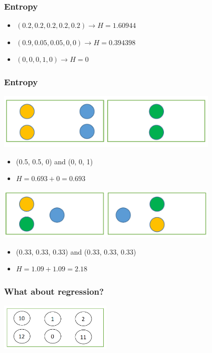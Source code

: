 \documentclass[default]{beamer}
\begin{document}
	\begin{frame}
		\frametitle{Entropy}
		\Large
		\begin{itemize}
			\item $(0.2, 0.2,0.2,0.2,0.2) \rightarrow H = 1.60944$
			\item $(0.9, 0.05,0.05,0, 0) \rightarrow H = 0.394398$
			\item $(0, 0,0, 1, 0) \rightarrow H = 0$
		\end{itemize}
		
	\end{frame}

	\begin{frame}
		\frametitle{Entropy}
		\Large
		\centering
		\includegraphics[width=0.8\textwidth]{trees22.png}
		\begin{itemize}
			\item (0.5, 0.5, 0) and (0, 0, 1)
			\item $H = 0.693 + 0 = 0.693$
		\end{itemize}
		
		\par\bigskip
		\centering
		\includegraphics[width=0.8\textwidth]{trees23.png}
		\begin{itemize}
			\item (0.33, 0.33, 0.33) and	(0.33, 0.33, 0.33)
			\item $H = 1.09 + 1.09 = 2.18$
		\end{itemize}
	\end{frame}
	
	\begin{frame}
		\frametitle{What about regression?}
		\centering
		\includegraphics[width=0.4\textwidth]{trees24.png}
	\end{frame}
\end{document}

